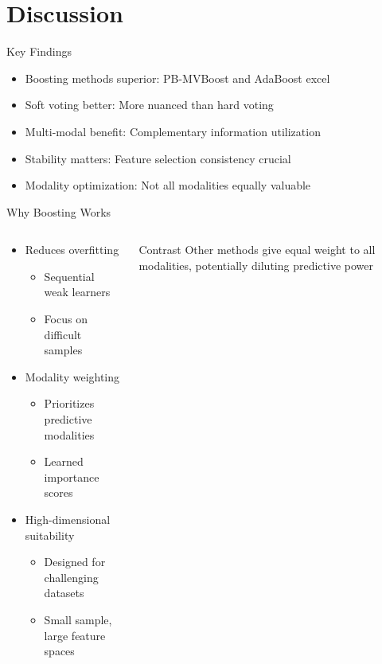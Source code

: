 \documentclass{beamer}
\begin{document}
\section{Discussion}

\begin{frame}{Key Findings}
\begin{itemize}[<+->]
\item \alert{Boosting methods superior}: PB-MVBoost and AdaBoost excel
\item \alert{Soft voting better}: More nuanced than hard voting
\item \alert{Multi-modal benefit}: Complementary information utilization
\item \alert{Stability matters}: Feature selection consistency crucial
\item \alert{Modality optimization}: Not all modalities equally valuable
\end{itemize}
\end{frame}

\begin{frame}{Why Boosting Works}
\begin{columns}
\begin{column}{0.6\textwidth}
\begin{itemize}
\item \alert{Reduces overfitting}
  \begin{itemize}
  \item Sequential weak learners
  \item Focus on difficult samples
  \end{itemize}
\item \alert{Modality weighting}
  \begin{itemize}
  \item Prioritizes predictive modalities
  \item Learned importance scores
  \end{itemize}
\item \alert{High-dimensional suitability}
  \begin{itemize}
  \item Designed for challenging datasets
  \item Small sample, large feature spaces
  \end{itemize}
\end{itemize}
\end{column}
\begin{column}{0.4\textwidth}
\begin{block}{Contrast}
Other methods give equal weight to all modalities, potentially diluting predictive power
\end{block}
\end{column}
\end{columns}
\end{frame}
\end{document}
